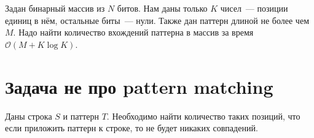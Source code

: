 \documentclass[addpoints]{exam}
\begin{document}
Задан бинарный массив из $N$ битов. Нам даны только $K$ чисел~--- позиции единиц в нём, остальные биты~--- нули. Также дан паттерн длиной не более чем  $M$. Надо найти количество вхождений паттерна в массив за время $\mathcal{O}(M + K \log{K})$.

\section{Задача не про pattern matching}

Даны строка $S$ и паттерн $T$. Необходимо найти количество таких позиций, что если приложить паттерн к строке, то не будет никаких совпадений.
\end{document}
